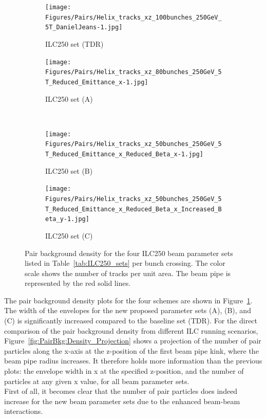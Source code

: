 \begin{figure}
\centering
\begin{subfigure}[t]{0.49\textwidth}
\centering
\texttt{[image: Figures/Pairs/Helix\_tracks\_xz\_100bunches\_250GeV\_5T\_DanielJeans-1.jpg]}
\caption{ILC250 set (TDR)}
\end{subfigure}
\hspace*{0.08cm}
\begin{subfigure}[t]{0.49\textwidth}
\centering
\texttt{[image: Figures/Pairs/Helix\_tracks\_xz\_80bunches\_250GeV\_5T\_Reduced\_Emittance\_x-1.jpg]}
\caption{ILC250 set (A)}
\end{subfigure}
\\
\begin{subfigure}[t]{0.49\textwidth}
\centering
\texttt{[image: Figures/Pairs/Helix\_tracks\_xz\_50bunches\_250GeV\_5T\_Reduced\_Emittance\_x\_Reduced\_Beta\_x-1.jpg]}
\caption{ILC250 set (B)}
\end{subfigure}
\hspace*{0.08cm}
\begin{subfigure}[t]{0.49\textwidth}
\centering
\texttt{[image: Figures/Pairs/Helix\_tracks\_xz\_50bunches\_250GeV\_5T\_Reduced\_Emittance\_x\_Reduced\_Beta\_x\_Increased\_Beta\_y-1.jpg]}
\caption{ILC250 set (C)}
\end{subfigure}
\caption[Pair background density for the proposed ILC250 beam parameter sets]{Pair background density for the four ILC250 beam parameter sets listed in Table~\ref{tab:ILC250_sets} per bunch crossing. 
The color scale shows the number of tracks per unit area.
The beam pipe is represented by the red solid lines.}
\label{fig:PairBkg:ILC250_Envelopes}
\end{figure}
The pair background density plots for the four schemes are shown in Figure~\ref{fig:PairBkg:ILC250_Envelopes}.
The width of the envelopes for the new proposed parameter sets (A), (B), and (C) is significantly increased compared to the baseline set (TDR).
For the direct comparison of the pair background density from different ILC running scenarios, Figure~\ref{fig:PairBkg:Density_Projection} shows a projection of the number of pair particles along the x-axis at the z-position of the first beam pipe kink, where the beam pipe radius increases.
It therefore holds more information than the previous plots: the envelope width in x at the specified z-position, and the number of particles at any given x value, for all beam parameter sets.
\\First of all, it becomes clear that the number of pair particles does indeed increase for the new beam parameter sets due to the enhanced beam-beam interactions.
